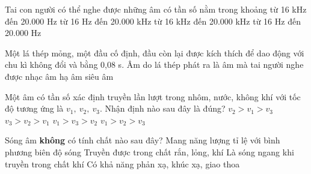  
 
 
 
 
 
 
 
 
 
 
 
 
 
 
 
 
 \begin{ex}%
 	 Tai con người có thể nghe được những âm có tần số nằm trong khoảng
 	\choice
 	{từ 16 kHz đến 20.000 Hz}
 	{từ 16 Hz đến 20.000 kHz}
 	{từ 16 kHz đến 20.000 kHz}
 	{\True từ 16 Hz đến 20.000 Hz}
 \end{ex} 
 
 \begin{ex}%
 	Một lá thép mỏng, một đầu cố định, đầu còn lại được kích thích để dao động với chu kì không đổi và bằng 0,08 s. Âm do lá thép phát ra là
 	\choice
 	{âm mà tai người nghe được}
 	{nhạc âm}
 	{\True hạ âm}
 	{siêu âm}
 \end{ex} 
 
 \begin{ex}%
 	Một âm có tần số xác định truyền lần lượt trong nhôm, nước, không khí với tốc độ tương ứng là $v_1,\ v_2,\ v_3$. Nhận định nào sau đây là đúng?
 	\choice
 	{$v_2 > v_1 > v_3$}
 	{$v_3 > v_2 > v_1$}
 	{$v_1 > v_3 > v_2$}
 	{\True $v_1 > v_2 > v_3$}
 \end{ex} 

 
 
 
 
 
 

 
 	\begin{ex}%
 		Sóng âm \textbf{không} có tính chất nào sau đây?
 		\choice
 		{Mang năng lượng tỉ lệ với bình phương biên độ sóng}
 		{Truyền được trong chất rắn, lỏng, khí}
 		{\True Là sóng ngang khi truyền trong chất khí}
 		{Có khả năng phản xạ, khúc xạ, giao thoa}
 		\loigiai{
 		}
 	\end{ex} 










